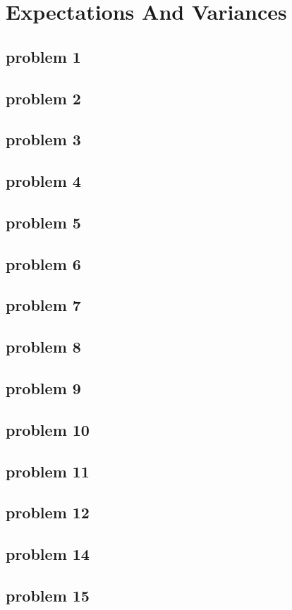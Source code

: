 \section{Expectations And Variances}

\subsection{problem 1}


\subsection{problem 2}


\subsection{problem 3}


\subsection{problem 4}


\subsection{problem 5}


\subsection{problem 6}


\subsection{problem 7}


\subsection{problem 8}


\subsection{problem 9}


\subsection{problem 10}


\subsection{problem 11}


\subsection{problem 12}


\subsection{problem 14}


\subsection{problem 15}


